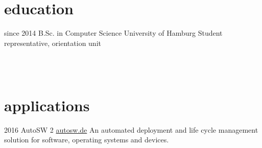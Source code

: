 \documentclass[]{friggeri-cv}
\begin{document}
\section{education}

\begin{entrylist}
  \entry
    {since 2014}
    {B.Sc. {\normalfont in Computer Science}}
    {University of Hamburg}
    {Student representative, orientation unit}
\end{entrylist} \\ \\

\section{applications}

\begin{entrylist}
 \entry
    {2016}
    {AutoSW 2}
    {\href{https://www.autosw.de/Demo/Benefit}{autosw.de}}
    {An automated deployment and life cycle management solution for software, operating systems and devices.}
\end{entrylist}

%

%
\end{document}
